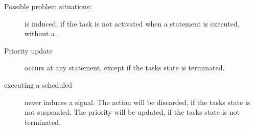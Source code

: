 Possible problem situations:
\begin{description}
\item[] is induced, if the task is not activated when 
a  statement is executed, without a .
\item[Priority update] occurs at any  statement,
 except if the tasks state is terminated.
\item[executing a scheduled ] never induces a signal. The action will
   be discarded, if the tasks state is not suspended. The priority will be 
   updated, if the tasks state is not terminated.
\end{description}


